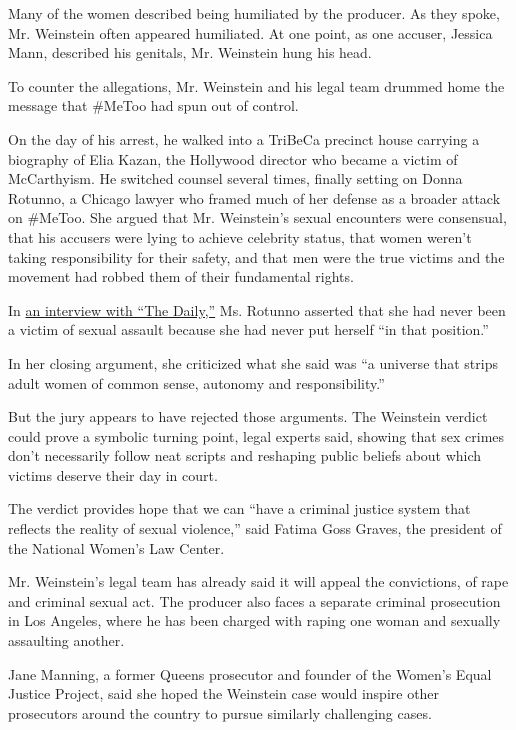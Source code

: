 Many of the women described being humiliated by the producer. As they
spoke, Mr. Weinstein often appeared humiliated. At one point, as one
accuser, Jessica Mann, described his genitals, Mr. Weinstein hung his
head.

To counter the allegations, Mr. Weinstein and his legal team drummed
home the message that \#MeToo had spun out of control.

On the day of his arrest, he walked into a TriBeCa precinct house
carrying a biography of Elia Kazan, the Hollywood director who became a
victim of McCarthyism. He switched counsel several times, finally
setting on Donna Rotunno, a Chicago lawyer who framed much of her
defense as a broader attack on \#MeToo. She argued that Mr. Weinstein's
sexual encounters were consensual, that his accusers were lying to
achieve celebrity status, that women weren't taking responsibility for
their safety, and that men were the true victims and the movement had
robbed them of their fundamental rights.

In
\href{https://www.nytimes3xbfgragh.onion/2020/02/07/podcasts/the-daily/weinstein-trial.html}{an
interview with ``The Daily,''} Ms. Rotunno asserted that she had never
been a victim of sexual assault because she had never put herself ``in
that position.''

In her closing argument, she criticized what she said was ``a universe
that strips adult women of common sense, autonomy and responsibility.''

But the jury appears to have rejected those arguments. The Weinstein
verdict could prove a symbolic turning point, legal experts said,
showing that sex crimes don't necessarily follow neat scripts and
reshaping public beliefs about which victims deserve their day in court.

The verdict provides hope that we can ``have a criminal justice system
that reflects the reality of sexual violence,'' said Fatima Goss Graves,
the president of the National Women's Law Center.

Mr. Weinstein's legal team has already said it will appeal the
convictions, of rape and criminal sexual act. The producer also faces a
separate criminal prosecution in Los Angeles, where he has been charged
with raping one woman and sexually assaulting another.

Jane Manning, a former Queens prosecutor and founder of the Women's
Equal Justice Project, said she hoped the Weinstein case would inspire
other prosecutors around the country to pursue similarly challenging
cases.

